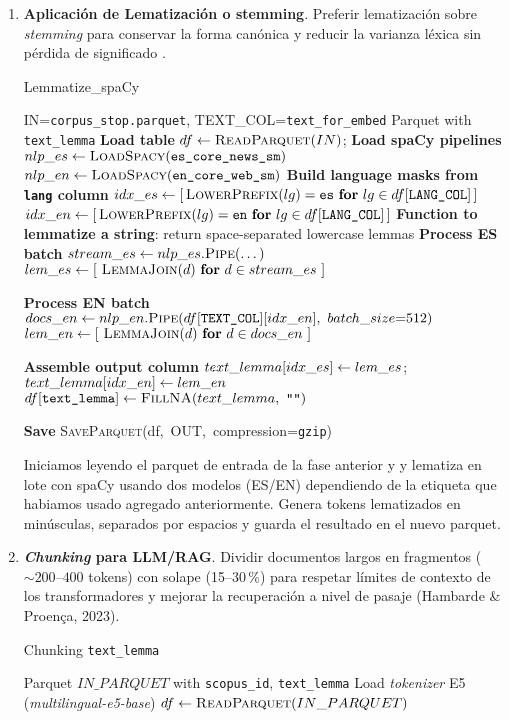 \begin{enumerate}
\item \textbf{Aplicación de Lematización o stemming}. Preferir lematización sobre \textit{stemming} para conservar la forma canónica y reducir 
    la varianza léxica sin pérdida de significado \parencite{tabassum2020}.
\begin{algorithmEN}[H]
\caption{Lemmatize\_spaCy}
\begin{algorithmic}[1]
\Require IN=\texttt{corpus\_stop.parquet}, TEXT\_COL=\texttt{text\_for\_embed}
\Ensure  Parquet with \texttt{text\_lemma}
\Statex \textbf{Load table}
\State $df \leftarrow \textsc{ReadParquet}(IN)$;
\Statex \textbf{Load spaCy pipelines}
\State $nlp\_es \leftarrow \textsc{LoadSpacy}(\texttt{es\_core\_news\_sm})$
\State $nlp\_en \leftarrow \textsc{LoadSpacy}(\texttt{en\_core\_web\_sm})$
\Statex \textbf{Build language masks from \texttt{lang} column}
\State $idx\_es \leftarrow [\,\textsc{LowerPrefix}(lg)=\texttt{es}\ \textbf{for}\ lg \in df[\texttt{LANG\_COL}]\,]$
\State $idx\_en \leftarrow [\,\textsc{LowerPrefix}(lg)=\texttt{en}\ \textbf{for}\ lg \in df[\texttt{LANG\_COL}]\,]$
\State \textbf{Function to lemmatize a string}: return space-separated lowercase lemmas
\Statex \textbf{Process ES batch}
\State $stream\_es \leftarrow nlp\_es.\textsc{Pipe}(\dots)$ 
\State $lem\_es \Assign [\ \textsc{LemmaJoin}(d)\ \textbf{for}\ d \in stream\_es\ ]$

\Statex \textbf{Process EN batch}
\State $docs\_en \Assign nlp\_en.\textsc{Pipe}(df[\texttt{TEXT\_COL}][idx\_en],\ batch\_size{=}512)$
\State $lem\_en \Assign [\ \textsc{LemmaJoin}(d)\ \textbf{for}\ d \in docs\_en\ ]$

\Statex \textbf{Assemble output column}
\State $text\_lemma[idx\_es] \leftarrow lem\_es$;\quad $text\_lemma[idx\_en] \leftarrow lem\_en$
\State $df[\texttt{text\_lemma}] \leftarrow \textsc{FillNA}(text\_lemma,\ \texttt{""})$ 

\Statex \textbf{Save}
\State \textsc{SaveParquet}(df,\ OUT,\ compression=\texttt{gzip}) 
\end{algorithmic}
\label{alg:lemmatize-spacy}
\end{algorithmEN}

Iniciamos leyendo el parquet de entrada de la fase anterior y y lematiza en lote con spaCy usando dos modelos (ES/EN) dependiendo de la etiqueta que habiamos usado agregado anteriormente.
Genera  tokens lematizados en minúsculas, separados por espacios y guarda el resultado en el nuevo parquet.

\item \textbf{\textit{Chunking} para LLM/RAG}. Dividir documentos largos en fragmentos (\(\sim 200\text{--}400\) tokens) con solape (15–30\,\%) para respetar 
    límites de contexto de los transformadores y mejorar la recuperación a nivel de pasaje (Hambarde \& Proença, 2023).
\begin{algorithmEN}[H]
\caption{Chunking \texttt{text\_lemma} }
\begin{algorithmic}[1]
\Require Parquet $IN\_PARQUET$ with \texttt{scopus\_id}, \texttt{text\_lemma}
\State Load \textit{tokenizer} E5 (\textit{multilingual-e5-base}) 
\State $df \gets \textsc{ReadParquet}(IN\_PARQUET)$


\end{algorithmic}
\end{algorithmEN}
\end{enumerate}
